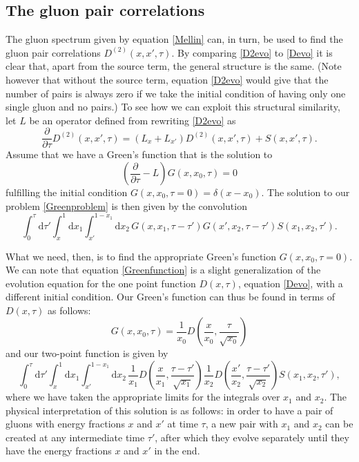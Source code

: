 \documentclass[a4paper,12pt]{article}
\newcommand{\party}[2]{\frac{\partial{#1}}{\partial{#2}}}
\numberwithin{equation}{section}
\begin{document}
\subsection{The gluon pair correlations}
The gluon spectrum given by equation \eqref{Mellin} can, in turn, be used to find the gluon pair correlations $D^{(2)}(x,x',\tau)$. By comparing \eqref{D2evo} to \eqref{Devo} it is clear that, apart from the source term, the general structure is the same. (Note however that without the source term, equation \eqref{D2evo} would give that the number of pairs is always zero if we take the initial condition of having only one single gluon and no pairs.) To see how we can exploit this structural similarity, let $L$ be an operator defined from rewriting \eqref{D2evo} as
\begin{equation}\label{Greenproblem}
\party{}{\tau}D^{(2)}(x,x',\tau) = (L_x + L_{x'})D^{(2)}(x,x',\tau)+S(x,x',\tau).
\end{equation}
Assume that we have a Green's function that is the solution to
\begin{equation}\label{Greenfunction}
(\party{}{\tau}- L)G(x,x_0,\tau)=0
\end{equation}
fulfilling the initial condition $G(x,x_0,\tau=0)=\delta(x-x_0)$. The solution to our problem \eqref{Greenproblem} is then given by the convolution
\begin{equation}
\int_0^\tau \mathrm{d}\tau' \int_x^1 \mathrm{d}x_1 \int_{x'}^{1-x_1} \mathrm{d}x_2\, G(x,x_1,\tau-\tau') G(x',x_2,\tau-\tau') S(x_1,x_2,\tau').
\end{equation}


What we need, then, is to find the appropriate Green's function $G(x,x_0,\tau=0)$. We can note that equation \eqref{Greenfunction} is a slight generalization of the evolution equation for the one point function $D(x,\tau)$, equation \eqref{Devo}, with a different initial condition. Our Green's function can thus be found in terms of $D(x,\tau)$ as follows:
\begin{equation}
G(x,x_0,\tau) = \frac{1}{x_0} D\left(\frac{x}{x_0},\frac{\tau}{\sqrt{x_0}}\right)
\end{equation}
and our two-point function is given by 
\begin{equation}\label{D2}
\int_0^\tau \mathrm{d}\tau' \int_x^1 \mathrm{d}x_1 \int_{x'}^{1-x_1} \mathrm{d}x_2\, 
\frac{1}{x_1} D\left(\frac{x}{x_1},\frac{\tau-\tau'}{\sqrt{x_1}}\right)
\frac{1}{x_2} D\left(\frac{x'}{x_2},\frac{\tau-\tau'}{\sqrt{x_2}}\right)
S(x_1,x_2,\tau'),
\end{equation}
where we have taken the appropriate limits for the integrals over $x_1$ and $x_2$. The physical interpretation of this solution is as follows: in order to have a pair of gluons with energy fractions $x$ and $x'$ at time $\tau$, a new pair with $x_1$ and $x_2$ can be created at any intermediate time $\tau'$, after which they evolve separately until they have the energy fractions $x$ and $x'$ in the end. 
\end{document}
